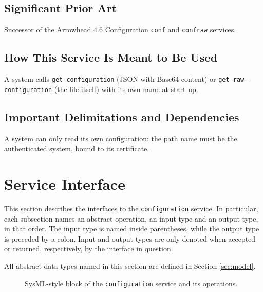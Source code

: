 \documentclass[a4paper]{arrowhead}
\begin{document}
\subsection{Significant Prior Art}

Successor of the Arrowhead 4.6 Configuration \texttt{conf} and \texttt{confraw} services.

\subsection{How This Service Is Meant to Be Used}

A system calls \texttt{get-\allowbreak{}configuration} (JSON with Base64 content) or \texttt{get-\allowbreak{}raw-\allowbreak{}configuration} (the file itself) with its own name at start-up.

\subsection{Important Delimitations and Dependencies}
\label{sec:delimitations}

A system can only read its own configuration: the path name must be the authenticated system, bound to its certificate.

\newpage

\section{Service Interface}
\label{sec:operations}

This section describes the interfaces to the \texttt{configuration} service.
In particular, each subsection names an abstract operation, an input type and an output type, in that order.
The input type is named inside parentheses, while the output type is preceded by a colon.
Input and output types are only denoted when accepted or returned, respectively, by the interface in question.

All abstract data types named in this section are defined in Section \ref{sec:model}.

\begin{figure}[ht!]
  \centering
  \caption{SysML-style block of the \texttt{configuration} service and its operations.}
  \label{fig:SD}
\end{figure}
\end{document}
